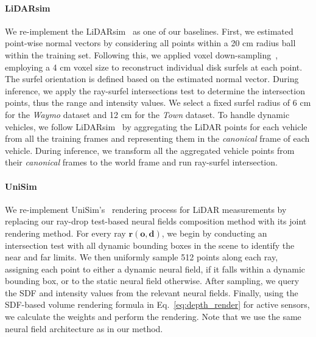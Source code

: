 \paragraph{LiDARsim} We re-implement the LiDARsim~\cite{manivasagam2020lidarsim} as one of our baselines. 
First, we estimated point-wise normal vectors by considering all points within a 20 cm radius ball within the training set. Following this, we applied voxel down-sampling~\cite{tang2022torchsparse}, employing a 4 cm voxel size to reconstruct individual disk surfels at each point. The surfel orientation is defined based on the estimated normal vector. During inference, we apply the ray-surfel intersections test to determine the intersection points, thus the range and intensity values. We select a fixed surfel radius of 6 cm for the \textit{Waymo} dataset and 12 cm for the \textit{Town} dataset.
To handle dynamic vehicles, we follow LiDARsim~\cite{manivasagam2020lidarsim} by aggregating the LiDAR points for each vehicle from all the training frames and representing them in the \textit{canonical} frame of each vehicle. During inference, we transform all the aggregated vehicle points from their \textit{canonical} frames to the world frame and run ray-surfel intersection.

\paragraph{UniSim} 
We re-implement UniSim's~\cite{yang2023unisim} rendering process for LiDAR measurements by replacing our ray-drop test-based neural fields composition method with its joint rendering method. For every ray $\mathbf{r} (\mathbf{o},\mathbf{d})$, we begin by conducting an intersection test with all dynamic bounding boxes in the scene to identify the near and far limits. We then uniformly sample 512 points along each ray, assigning each point to either a dynamic neural field, if it falls within a dynamic bounding box, or to the static neural field otherwise. After sampling, we query the SDF and intensity values from the relevant neural fields. Finally, using the SDF-based volume rendering formula in Eq.~\ref{eq:depth_render} for active sensors, we calculate the weights and perform the rendering. Note that we use the same neural field architecture as in our method.